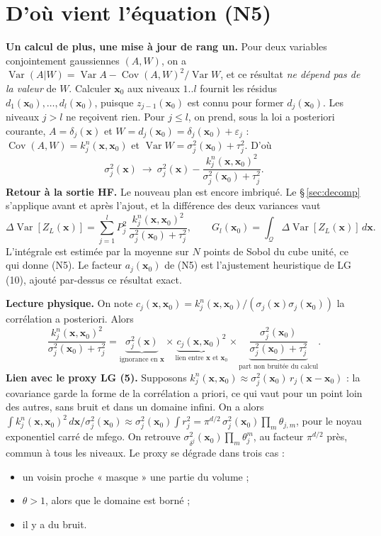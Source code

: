 \documentclass[10pt,a4paper]{article}
\newcommand{\vx}{\bm{x}}
\newcommand{\Q}{\mathcal{Q}}
\DeclareMathOperator{\Var}{Var}
\DeclareMathOperator{\Cov}{Cov}
\begin{document}
\section{D'où vient l'équation (N5)}\label{sec:gain}
\textbf{Un calcul de plus, une mise à jour de rang un.} Pour deux variables conjointement gaussiennes
$(A,W)$, on a $\Var(A|W)=\Var A-\Cov(A,W)^2/\Var W$, et ce résultat \emph{ne dépend pas de la valeur} de
$W$. Calculer $\vx_0$ aux niveaux $1..l$ fournit les résidus $d_1(\vx_0),\dots,d_l(\vx_0)$, puisque
$z_{j-1}(\vx_0)$ est connu pour former $d_j(\vx_0)$. Les niveaux $j>l$ ne reçoivent rien. Pour $j\le l$, on
prend, sous la loi a posteriori courante, $A=\delta_j(\vx)$ et $W=d_j(\vx_0)=\delta_j(\vx_0)+\varepsilon_j$ :
$\Cov(A,W)=k^n_j(\vx,\vx_0)$ et $\Var W=\sigma_j^2(\vx_0)+\tau_j^2$. D'où
\[
  \sigma_j^2(\vx)\ \longrightarrow\ \sigma_j^2(\vx)-\frac{k^n_j(\vx,\vx_0)^2}{\sigma_j^2(\vx_0)+\tau_j^2}.
\]
\textbf{Retour à la sortie HF.} Le nouveau plan est encore imbriqué. Le §\,\ref{sec:decomp} s'applique avant
et après l'ajout, et la différence des deux variances vaut
\[
  \Delta\Var[Z_L(\vx)]=\sum_{j=1}^{l}P_j^2\,\frac{k^n_j(\vx,\vx_0)^2}{\sigma_j^2(\vx_0)+\tau_j^2},
  \qquad
  G_l(\vx_0)=\int_\Q\Delta\Var[Z_L(\vx)]\,d\vx .
\]
L'intégrale est estimée par la moyenne sur $N$ points de Sobol du cube unité, ce qui donne (N5). Le
facteur $a_j(\vx_0)$ de (N5) est l'ajustement heuristique de LG (10), ajouté par-dessus ce résultat exact.

\textbf{Lecture physique.} On note $c_j(\vx,\vx_0)=k^n_j(\vx,\vx_0)/(\sigma_j(\vx)\sigma_j(\vx_0))$ la
corrélation a posteriori. Alors
\[
  \frac{k^n_j(\vx,\vx_0)^2}{\sigma_j^2(\vx_0)+\tau_j^2}
  =\underbrace{\sigma_j^2(\vx)}_{\text{ignorance en }\vx}\times
  \underbrace{c_j(\vx,\vx_0)^2}_{\text{lien entre }\vx\text{ et }\vx_0}\times
  \underbrace{\frac{\sigma_j^2(\vx_0)}{\sigma_j^2(\vx_0)+\tau_j^2}}_{\text{part non bruitée du calcul}} .
\]
\textbf{Lien avec le proxy LG (5).} Supposons $k^n_j(\vx,\vx_0)\approx\sigma_j^2(\vx_0)\,r_j(\vx-\vx_0)$ : la
covariance garde la forme de la corrélation a priori, ce qui vaut pour un point loin des autres, sans
bruit et dans un domaine infini. On a alors
$\int k^n_j(\vx,\vx_0)^2\,d\vx/\sigma_j^2(\vx_0)\approx\sigma_j^2(\vx_0)\int r_j^2
=\pi^{d/2}\,\sigma_j^2(\vx_0)\prod_m\theta_{j,m}$, pour le noyau exponentiel carré de mfego. On retrouve
$\sigma^2_{\delta^j}(\vx_0)\prod_m\theta_j^m$, au facteur $\pi^{d/2}$ près, commun à tous les niveaux. Le
proxy se dégrade dans trois cas :
\begin{itemize}
  \item un voisin proche « masque » une partie du volume ;
  \item $\theta>1$, alors que le domaine est borné ;
  \item il y a du bruit.
\end{itemize}
\end{document}
